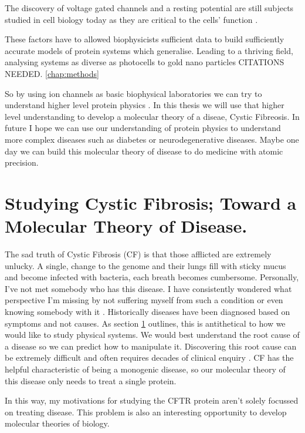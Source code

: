 The discovery of voltage gated channels and a resting potential are still subjects studied in cell biology today as they are critical to the cells' function \cite{}.

These factors have to allowed biophysicists sufficient data to build sufficiently accurate models of protein systems which generalise. Leading to a thriving field, analysing systems as diverse as photocells to gold nano particles CITATIONS NEEDED. \ref{chap:methods}

So by using ion channels as basic biophysical laboratories we can try to understand higher level protein physics \cite{}. In this thesis we will use that higher level understanding to develop a molecular theory of a diseae, Cystic Fibreosis. In future I hope we can use our understanding of protein physics to understand more complex diseases such as diabetes or neurodegenerative diseases. Maybe one day we can build this molecular theory of disease to do medicine with atomic precision.


\section{Studying Cystic Fibrosis; Toward a Molecular Theory of Disease.} 

The sad truth of Cystic Fibrosis (CF) is that those afflicted are extremely unlucky. A single, change to the genome and their lungs fill with sticky mucus and become infected with bacteria, each breath becomes cumbersome. Personally, I've not met somebody who has this disease. I have consistently wondered what perspective I'm missing by not suffering myself from such a condition or even knowing somebody with it \cite{foucault1994}. Historically diseases have been diagnosed based on symptoms and not causes. As section \ref{} outlines, this is antithetical to how we would like to study physical systems. We would best understand the root cause of a disease so we can predict how to manipulate it. Discovering this root cause can be extremely difficult and often requires decades of clinical enquiry \cite{}. CF has the helpful characteristic of being a monogenic disease, so our molecular theory of this disease only needs to treat a single protein. 

In this way, my motivations for studying the CFTR protein aren't solely focussed on treating disease. This problem is also an interesting opportunity to develop molecular theories of biology. 


